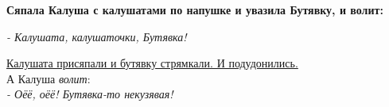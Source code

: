 \documentclass{article}
\begin{document}
\textbf{Сяпала Калуша с калушатами по напушке и увазила Бутявку, и волит:}

\textit{- Калушата, калушаточки, Бутявка!}

\underline{Калушата присяпали и бутявку стрямкали. И подудонились.}\\
А Калуша \emph{волит}:\\
\textit{- Оёё, оёё! \emph{Бутявка}-то некузявая!}
\end{document}
